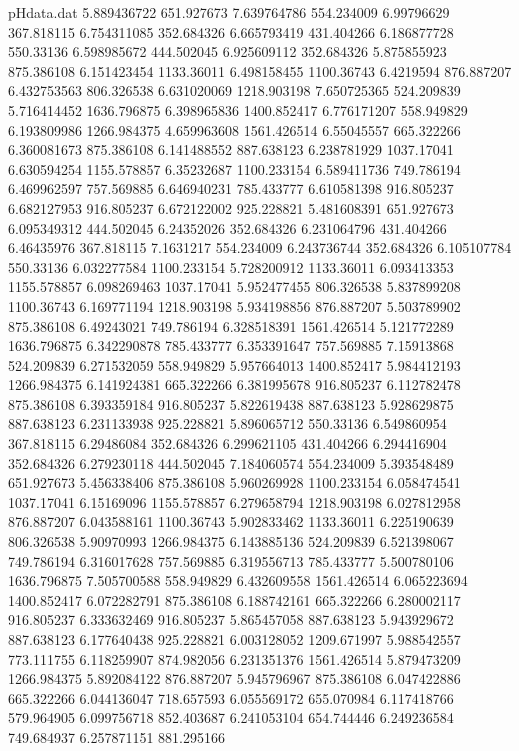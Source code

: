\begin{filecontents}{pHdata.dat}
5.889436722	651.927673
7.639764786	554.234009
6.99796629	367.818115
6.754311085	352.684326
6.665793419	431.404266
6.186877728	550.33136
6.598985672	444.502045
6.925609112	352.684326
5.875855923	875.386108
6.151423454	1133.36011
6.498158455	1100.36743
6.4219594	876.887207
6.432753563	806.326538
6.631020069	1218.903198
7.650725365	524.209839
5.716414452	1636.796875
6.398965836	1400.852417
6.776171207	558.949829
6.193809986	1266.984375
4.659963608	1561.426514
6.55045557	665.322266
6.360081673	875.386108
6.141488552	887.638123
6.238781929	1037.17041
6.630594254	1155.578857
6.35232687	1100.233154
6.589411736	749.786194
6.469962597	757.569885
6.646940231	785.433777
6.610581398	916.805237
6.682127953	916.805237
6.672122002	925.228821
5.481608391	651.927673
6.095349312	444.502045
6.24352026	352.684326
6.231064796	431.404266
6.46435976	367.818115
7.1631217	554.234009
6.243736744	352.684326
6.105107784	550.33136
6.032277584	1100.233154
5.728200912	1133.36011
6.093413353	1155.578857
6.098269463	1037.17041
5.952477455	806.326538
5.837899208	1100.36743
6.169771194	1218.903198
5.934198856	876.887207
5.503789902	875.386108
6.49243021	749.786194
6.328518391	1561.426514
5.121772289	1636.796875
6.342290878	785.433777
6.353391647	757.569885
7.15913868	524.209839
6.271532059	558.949829
5.957664013	1400.852417
5.984412193	1266.984375
6.141924381	665.322266
6.381995678	916.805237
6.112782478	875.386108
6.393359184	916.805237
5.822619438	887.638123
5.928629875	887.638123
6.231133938	925.228821
5.896065712	550.33136
6.549860954	367.818115
6.29486084	352.684326
6.299621105	431.404266
6.294416904	352.684326
6.279230118	444.502045
7.184060574	554.234009
5.393548489	651.927673
5.456338406	875.386108
5.960269928	1100.233154
6.058474541	1037.17041
6.15169096	1155.578857
6.279658794	1218.903198
6.027812958	876.887207
6.043588161	1100.36743
5.902833462	1133.36011
6.225190639	806.326538
5.90970993	1266.984375
6.143885136	524.209839
6.521398067	749.786194
6.316017628	757.569885
6.319556713	785.433777
5.500780106	1636.796875
7.505700588	558.949829
6.432609558	1561.426514
6.065223694	1400.852417
6.072282791	875.386108
6.188742161	665.322266
6.280002117	916.805237
6.333632469	916.805237
5.865457058	887.638123
5.943929672	887.638123
6.177640438	925.228821
6.003128052	1209.671997
5.988542557	773.111755
6.118259907	874.982056
6.231351376	1561.426514
5.879473209	1266.984375
5.892084122	876.887207
5.945796967	875.386108
6.047422886	665.322266
6.044136047	718.657593
6.055569172	655.070984
6.117418766	579.964905
6.099756718	852.403687
6.241053104	654.744446
6.249236584	749.684937
6.257871151	881.295166

\end{filecontents}

